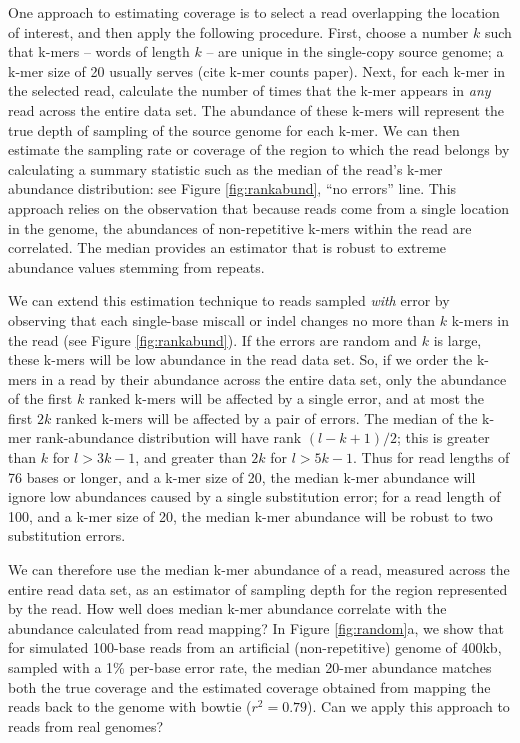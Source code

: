 \documentclass[10pt]{article}
\begin{document}
One approach to estimating coverage is to select a read overlapping
the location of interest, and then apply the following
procedure. First, choose a number $k$ such that k-mers -- words of
length $k$ -- are unique in the single-copy source genome; a k-mer
size of 20 usually serves (cite k-mer counts paper).  Next, for each
k-mer in the selected read, calculate the number of times that the
k-mer appears in {\em any} read across the entire data set.  The
abundance of these k-mers will represent the true depth of sampling of
the source genome for each k-mer.  We can then estimate the sampling
rate or coverage of the region to which the read belongs by
calculating a summary statistic such as the median of the
read's k-mer abundance distribution: see Figure \ref{fig:rankabund},
``no errors'' line. This approach relies on the observation that
because reads come from a single location in the genome, the
abundances of non-repetitive k-mers within the read are correlated.
The median provides an estimator that is robust to extreme abundance
values stemming from repeats.

We can extend this estimation technique to reads sampled {\em with}
error by observing that each single-base miscall or indel changes no
more than $k$ k-mers in the read (see Figure \ref{fig:rankabund}).  If
the errors are random and $k$ is large, these k-mers will be low
abundance in the read data set.  So, if we order the k-mers in a read
by their abundance across the entire data set, only the abundance of
the first $k$ ranked k-mers will be affected by a single error, and at
most the first $2k$ ranked k-mers will be affected by a pair of
errors.  The median of the k-mer rank-abundance distribution will have
rank $(l - k + 1) / 2$; this is greater than $k$ for $l > 3k-1$, and
greater than $2k$ for $l > 5k-1$.  Thus for read lengths of 76 bases
or longer, and a k-mer size of 20, the median k-mer abundance will
ignore low abundances caused by a single substitution error; for a read
length of 100, and a k-mer size of 20, the median k-mer abundance will
be robust to two substitution errors.

We can therefore use the median k-mer abundance of a read, measured
across the entire read data set, as an estimator of sampling depth for
the region represented by the read. How well does median k-mer
abundance correlate with the abundance calculated from read mapping?
In Figure \ref{fig:random}a, we show that for simulated 100-base reads
from an artificial (non-repetitive) genome of 400kb, sampled with a
1\% per-base error rate, the median 20-mer abundance matches both the
true coverage and the estimated coverage obtained from mapping the
reads back to the genome with bowtie ($r^2 = 0.79$).  Can we apply
this approach to reads from real genomes?
\end{document}
